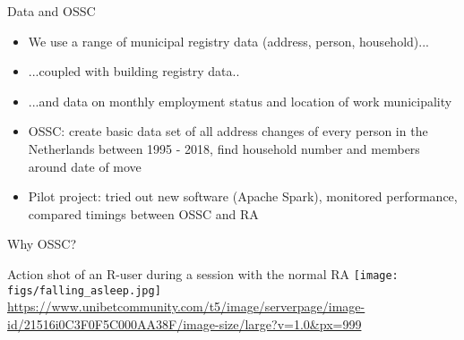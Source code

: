 \documentclass[final, 12pt, aspectratio=169, xcolor={dvipsnames}]{beamer}
\newcommand*{\figs}{../figs}%
\begin{document}
\begin{frame}{Data and OSSC}
  \begin{itemize}
  \item We use a range of municipal registry data (address, person, household)...
  \item ...coupled with building registry data..
  \item ...and data on monthly employment status and location of work municipality
  \item OSSC: create basic data set of all address changes of every person in the Netherlands between 1995 - 2018, find household number and members around date of move
  \item Pilot project: tried out new software (Apache Spark), monitored performance, compared timings between OSSC and RA
  \end{itemize}

\end{frame}

\begin{frame}{Why OSSC?}
  \end{frame}

\begin{frame}{Action shot of an R-user during a session with the normal RA}
  \centering
  \texttt{[image: \\figs/falling\_asleep.jpg]}
  \\
  \tiny
  \url{https://www.unibetcommunity.com/t5/image/serverpage/image-id/21516i0C3F0F5C000AA38F/image-size/large?v=1.0&px=999}
  \end{frame}
\end{document}
